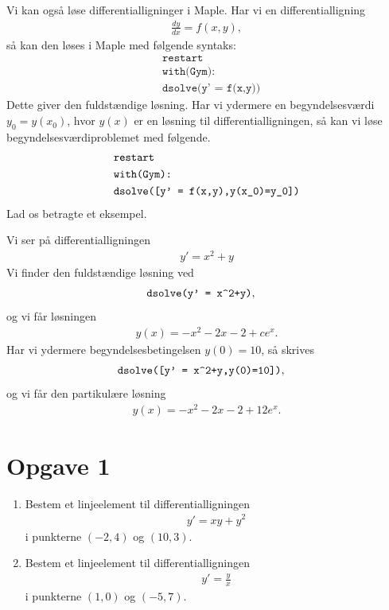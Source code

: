 Vi kan også løse differentialligninger i Maple. Har vi en differentialligning
\begin{align*}
	\frac{dy}{dx} = f(x,y), 
\end{align*}
så kan den løses i Maple med følgende syntaks:
\begin{align*}
	&\texttt{restart}\\
	&\texttt{with(Gym):}\\
	&\texttt{dsolve(y' = f(x,y))}
\end{align*}
Dette giver den fuldstændige løsning. Har vi ydermere en begyndelsesværdi $y_0 = y(x_0)$, hvor $y(x)$ er en løsning til differentialligningen, så kan vi løse begyndelsesværdiproblemet med følgende.
\begin{align*}
	&\texttt{restart}\\
	&\texttt{with(Gym):}\\
	&\texttt{dsolve([y' = f(x,y),y(x\string_0)=y\string_0])}
\end{align*}
Lad os betragte et eksempel.
\begin{exa}
	Vi ser på differentialligningen
	\begin{align*}
		y' = x^2 +y
	\end{align*}
	Vi finder den fuldstændige løsning ved
	\begin{align*}
		&\texttt{dsolve(y' = x\string^2+y)},
	\end{align*}
	og vi får løsningen
	\begin{align*}
		y(x) = -x^2 - 2x - 2 + ce^x.
	\end{align*}
	Har vi ydermere begyndelsesbetingelsen $y(0) = 10$, så skrives
	\begin{align*}
		&\texttt{dsolve([y' = x\string^2+y,y(0)=10])},
	\end{align*}
	og vi får den partikulære løsning
	\begin{align*}
		y(x) = -x^2 - 2x - 2 + 12e^x.
	\end{align*}
\end{exa}	


\section*{Opgave 1}
\begin{enumerate}[label=\roman*)]
	\item Bestem et linjeelement til differentialligningen 
	\begin{align*}
		y' = xy+y^2
	\end{align*}
	i punkterne $(-2,4)$ og $(10,3)$.
	\item Bestem et linjeelement til differentialligningen 
	\begin{align*}
		y' = \frac{y}{x}
	\end{align*}
	i punkterne $(1,0)$ og $(-5,7)$.
\end{enumerate}

